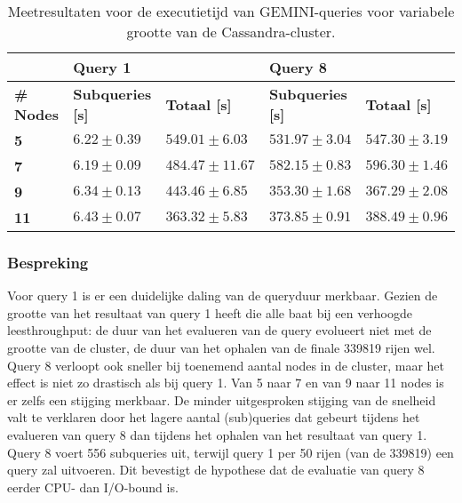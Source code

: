\begin{table}[!h]
\centering
\begin{tabular}{@{}lllll@{}}
\cmidrule(l){2-5}
                                       & \multicolumn{2}{|l|}{\textbf{Query 1}}                                                      & \multicolumn{2}{l|}{\textbf{Query 8}}                             \\ 
\midrule
\multicolumn{1}{|l|}{\textbf{\# Nodes}}  & \multicolumn{1}{l|}{\textbf{Subqueries [s]}}               & \multicolumn{1}{l|}{\textbf{Totaal [s]}} & \multicolumn{1}{l|}{\textbf{Subqueries [s]}} & \multicolumn{1}{l|}{\textbf{Totaal [s]}} \\ \midrule
\multicolumn{1}{|l|}{\textbf{5}} & \multicolumn{1}{l|}{$6.22 \pm 0.39$} & \multicolumn{1}{l|}{$549.01 \pm 6.03$}             & \multicolumn{1}{l|}{$531.97 \pm 3.04$}          & \multicolumn{1}{l|}{$547.30 \pm 3.19$}                        \\
\multicolumn{1}{|l|}{\textbf{7}} & \multicolumn{1}{l|}{$6.19 \pm 0.09$} &\multicolumn{1}{l|}{$484.47 \pm 11.67$}            & \multicolumn{1}{l|}{$582.15 \pm 0.83$}          & \multicolumn{1}{l|}{$596.30 \pm 1.46$}                        \\
\multicolumn{1}{|l|}{\textbf{9}} & \multicolumn{1}{l|}{$6.34 \pm 0.13$} &\multicolumn{1}{l|}{$443.46 \pm 6.85$}            & \multicolumn{1}{l|}{$353.30 \pm 1.68$}           & \multicolumn{1}{l|}{$367.29 \pm 2.08$}                        \\
\multicolumn{1}{|l|}{\textbf{11}} & \multicolumn{1}{l|}{$6.43 \pm 0.07$} &\multicolumn{1}{l|}{$363.32 \pm 5.83$}           & \multicolumn{1}{l|}{$373.85 \pm 0.91$}           & \multicolumn{1}{l|}{$388.49 \pm 0.96$}                        \\
\bottomrule
\end{tabular}
\caption{Meetresultaten voor de executietijd van GEMINI-queries voor variabele grootte van de Cassandra-cluster.}
\end{table}

\subsubsection{Bespreking}

Voor query 1 is er een duidelijke daling van de queryduur merkbaar. Gezien de grootte van het resultaat van query 1 heeft die alle baat bij een verhoogde leesthroughput: de duur van het evalueren van de query evolueert niet met de grootte van de cluster, de duur van het ophalen van de finale 339819 rijen wel.\\
Query 8 verloopt ook sneller bij toenemend aantal nodes in de cluster, maar het effect is niet zo drastisch als bij query 1. Van 5 naar 7 en van 9 naar 11 nodes is er zelfs een stijging merkbaar. De minder uitgesproken stijging van de snelheid valt te verklaren door het lagere aantal (sub)queries dat gebeurt tijdens het evalueren van query 8 dan tijdens het ophalen van het resultaat van query 1. Query 8 voert 556 subqueries uit, terwijl query 1 per 50 rijen (van de 339819) een query zal uitvoeren. Dit bevestigt de hypothese dat de evaluatie van query 8 eerder CPU- dan I/O-bound is.

